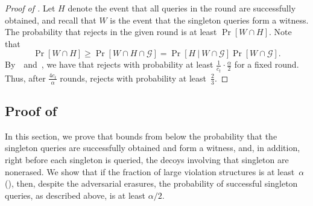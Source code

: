 \documentclass[11pt]{article}
\numberwithin{equation}{section}
\theoremstyle{definition}
\theoremstyle{plain}
\begin{document}
\begin{proof}[Proof of ]
Let $H$ denote the event that all queries in the round are successfully obtained, and recall that $W$ is the event that the singleton queries form a witness. The probability that  rejects in the given round is at least $\Pr[W \cap H]$. Note that
\begin{equation*}
    \Pr[W \cap H] \geq \Pr[W \cap H \cap \mathcal{G}] = \Pr[H \:|\: W \cap \mathcal{G}]\Pr[W \cap \mathcal{G}].
\end{equation*} By~~and~, we have that  rejects with probability at least $\frac{1}{c_t} \cdot \frac{\alpha}{2}$ for a fixed round. Thus, after $\frac{4c_t}{\alpha}$ rounds,  rejects with probability at least~$\frac{2}{3}$. 
\end{proof}



\subsection{Proof of } \label{sec:lem_witness}

In this section, we prove  that bounds from below the probability that the singleton queries are successfully obtained and form a witness, and, in addition, right before each singleton is queried, the decoys involving that singleton are nonerased. We show that if the fraction of large violation structures is at least~$\alpha$ (), then, despite the adversarial erasures, the probability of successful singleton queries, as described above, is at least $\alpha/2$.
\end{document}
